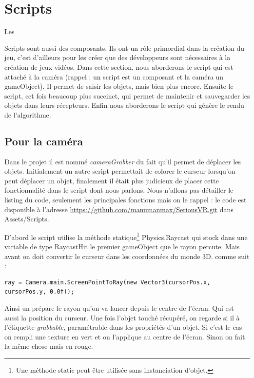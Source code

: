 \documentclass[a4paper,11pt]{myreport}
\begin{document}
	\section{Scripts}
	\hypertarget{scriptTarget}{Les} Scripts sont aussi des composants. Ils ont un rôle primordial dans la création du jeu, c'est d'ailleurs pour les créer que des développeurs sont nécessaires à la création de jeux vidéos.
	Dans cette section, nous aborderons le script qui est attaché à la caméra (rappel : un script est un composant et la caméra un gameObject). Il permet de saisir les objets, mais bien plus encore. Ensuite le script, cet fois beaucoup plus succinct, qui permet de maintenir et sauvegarder les objets dans leurs récepteurs. Enfin nous aborderons le script qui génère le rendu de l'algorithme.
	\subsection{Pour la caméra}
	Dans le projet il est nommé \textit{cameraGrabber} du fait qu'il permet de déplacer les objets. Initialement un autre script permettait de colorer le curseur lorsqu'on peut déplacer un objet, finalement il était plus judicieux de placer cette fonctionnalité   dans le script dont nous parlons. Nous n'allons pas détailler le listing du code, seulement les principales fonctions mais on le rappel : le code est disponible à l'adresse \href{https://github.com/manumanmax/SeriousVR.git}{https://github.com/manumanmax/SeriousVR.git} dans Assets/Scripts.
	
	\par D'abord le script utilise la méthode statique\footnote{Une méthode static peut être utilisée sans instanciation d'objet.} Physics.Raycast qui stock dans une variable de type RaycastHit le premier gameObject que le rayon percute. Mais avant on doit convertir le curseur dans les coordonnées du monde 3D. comme suit : 
	
	\lstset{style=sharpc}
\begin{lstlisting}
ray = Camera.main.ScreenPointToRay(new Vector3(cursorPos.x, cursorPos.y, 0.0f));
\end{lstlisting}
	Ainsi un prépare le rayon qu'on va lancer depuis le centre de l'écran. Qui est aussi la position du curseur. Une fois l'objet touché récupéré, on regarde si il à l'étiquette \textit{grabbable}, paramétrable dans les propriétés d'un objet.
	Si c'est le cas on rempli une texture en vert et on l'applique au centre de l'écran. Sinon on fait la même chose mais en rouge.
	
\end{document}
